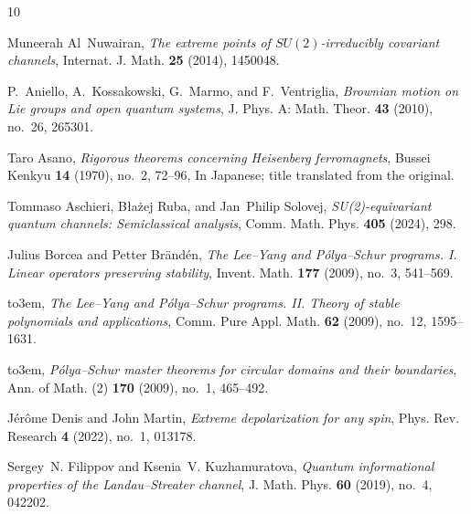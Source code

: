 \documentclass[reqno]{amsart}
\theoremstyle{definition}
\theoremstyle{remark}
\begin{document}
\enlargethispage{2\baselineskip}
\makeatletter{}\makeatother
\providecommand{\bysame}{\leavevmode\hbox to3em{\hrulefill}\thinspace}
\providecommand{\MR}{\relax\ifhmode\unskip\space\fi MR }
\providecommand{\MRhref}[2]{%
  \href{http://www.ams.org/mathscinet-getitem?mr=#1}{#2}
}
\providecommand{\href}[2]{#2}
\begin{thebibliography}{10}

Muneerah Al~Nuwairan, \emph{The extreme points of {$SU(2)$}-irreducibly
  covariant channels}, Internat. J. Math. \textbf{25} (2014), 1450048.

P.~Aniello, A.~Kossakowski, G.~Marmo, and F.~Ventriglia, \emph{Brownian motion
  on {Lie} groups and open quantum systems}, J. Phys. A: Math. Theor.
  \textbf{43} (2010), no.~26, 265301.

Taro Asano, \emph{Rigorous theorems concerning {Heisenberg} ferromagnets},
  Bussei Kenkyu \textbf{14} (1970), no.~2, 72--96, In Japanese; title
  translated from the original.

Tommaso Aschieri, B{\l}a{\.{z}}ej Ruba, and Jan~Philip Solovej,
  \emph{{SU(2)}-equivariant quantum channels: Semiclassical analysis}, Comm.
  Math. Phys. \textbf{405} (2024), 298.

Julius Borcea and Petter Br{\"a}nd{\'e}n, \emph{The {Lee--Yang} and
  {P{\'o}lya--Schur} programs. {I}. {Linear} operators preserving stability},
  Invent. Math. \textbf{177} (2009), no.~3, 541--569.

\bysame, \emph{The {Lee--Yang} and {P{\'o}lya--Schur} programs. {II}. {Theory}
  of stable polynomials and applications}, Comm. Pure Appl. Math. \textbf{62}
  (2009), no.~12, 1595--1631.

\bysame, \emph{{P{\'o}lya--Schur} master theorems for circular domains and
  their boundaries}, Ann. of Math. (2) \textbf{170} (2009), no.~1, 465--492.

J\'{e}r\^{o}me Denis and John Martin, \emph{Extreme depolarization for any
  spin}, Phys. Rev. Research \textbf{4} (2022), no.~1, 013178.

Sergey~N. Filippov and Ksenia~V. Kuzhamuratova, \emph{Quantum informational
  properties of the {Landau--Streater} channel}, J. Math. Phys. \textbf{60}
  (2019), no.~4, 042202.


\end{thebibliography}
\end{document}
